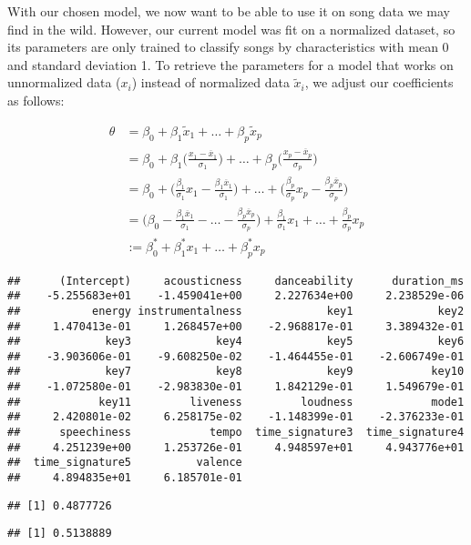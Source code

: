 \documentclass[
]{article}
\begin{document}
With our chosen model, we now want to be able to use it on song data we
may find in the wild. However, our current model was fit on a normalized
dataset, so its parameters are only trained to classify songs by
characteristics with mean 0 and standard deviation 1. To retrieve the
parameters for a model that works on unnormalized data (\(x_i\)) instead
of normalized data \(\tilde{x}_i\), we adjust our coefficients as
follows:

\[
\begin{equation*}
\begin{split}
  \theta &= \beta_0 + \beta_1 \tilde{x}_1 + \ldots + \beta_p \tilde{x}_p \\
  &= \beta_0 + \beta_1\Big(\frac{x_1-\overline{x}_1}{\sigma_1}\Big) + \ldots + \beta_p\Big(\frac{x_p-\overline{x}_p}{\sigma_p}\Big) \\
  &= \beta_0 + \Big(\frac{\beta_1}{\sigma_1}x_1 - \frac{\beta_1\overline{x}_1}{\sigma_1}\Big) + \ldots + \Big(\frac{\beta_p}{\sigma_p}x_p - \frac{\beta_p\overline{x}_p}{\sigma_p}\Big) \\
  &= \Big( \beta_0 - \frac{\beta_1\overline{x}_1}{\sigma_1} - \ldots - \frac{\beta_p\overline{x}_p}{\sigma_p} \Big) + \frac{\beta_1}{\sigma_1}x_1 + \ldots + \frac{\beta_p}{\sigma_p}x_p \\
  &:= \beta_0^* + \beta_1^*x_1 + \ldots + \beta_p^*x_p
\end{split}
\end{equation*}
\]

\begin{verbatim}
##      (Intercept)     acousticness     danceability      duration_ms 
##    -5.255683e+01    -1.459041e+00     2.227634e+00     2.238529e-06 
##           energy instrumentalness             key1             key2 
##     1.470413e-01     1.268457e+00    -2.968817e-01     3.389432e-01 
##             key3             key4             key5             key6 
##    -3.903606e-01    -9.608250e-02    -1.464455e-01    -2.606749e-01 
##             key7             key8             key9            key10 
##    -1.072580e-01    -2.983830e-01     1.842129e-01     1.549679e-01 
##            key11         liveness         loudness            mode1 
##     2.420801e-02     6.258175e-02    -1.148399e-01    -2.376233e-01 
##      speechiness            tempo  time_signature3  time_signature4 
##     4.251239e+00     1.253726e-01     4.948597e+01     4.943776e+01 
##  time_signature5          valence 
##     4.894835e+01     6.185701e-01
\end{verbatim}

\begin{verbatim}
## [1] 0.4877726
\end{verbatim}

\begin{verbatim}
## [1] 0.5138889
\end{verbatim}
\end{document}
